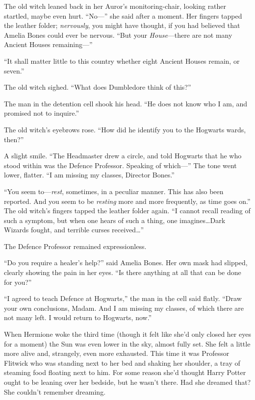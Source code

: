The old witch leaned back in her Auror’s monitoring-chair, looking rather startled, maybe even hurt. “No—” she said after a moment. Her fingers tapped the leather folder; \emph{nervously}, you might have thought, if you had believed that Amelia Bones could ever be nervous. “But your \emph{House}—there are not many Ancient Houses remaining—”

“It shall matter little to this country whether eight Ancient Houses remain, or seven.”

The old witch sighed. “What does Dumbledore think of this?”

The man in the detention cell shook his head. “He does not know who I am, and promised not to inquire.”

The old witch’s eyebrows rose. “How did he identify you to the Hogwarts wards, then?”

A slight smile. “The Headmaster drew a circle, and told Hogwarts that he who stood within was the Defence Professor. Speaking of which—” The tone went lower, flatter. “I am missing my classes, Director Bones.”

“You seem to—\emph{rest}, sometimes, in a peculiar manner. This has also been reported. And you seem to be \emph{resting} more and more frequently, as time goes on.” The old witch’s fingers tapped the leather folder again. “I cannot recall reading of such a symptom, but when one hears of such a thing, one imagines…Dark Wizards fought, and terrible curses received…”

The Defence Professor remained expressionless.

“Do you require a healer’s help?” said Amelia Bones. Her own mask had slipped, clearly showing the pain in her eyes. “Is there anything at all that can be done for you?”

“I agreed to teach Defence at Hogwarts,” the man in the cell said flatly. “Draw your own conclusions, Madam. And I am missing my classes, of which there are not many left. I would return to Hogwarts, now.”

\later

When Hermione woke the third time (though it felt like she’d only closed her eyes for a moment) the Sun was even lower in the sky, almost fully set. She felt a little more alive and, strangely, even more exhausted. This time it was Professor Flitwick who was standing next to her bed and shaking her shoulder, a tray of steaming food floating next to him. For some reason she’d thought Harry Potter ought to be leaning over her bedside, but he wasn’t there. Had she dreamed that? She couldn’t remember dreaming.

